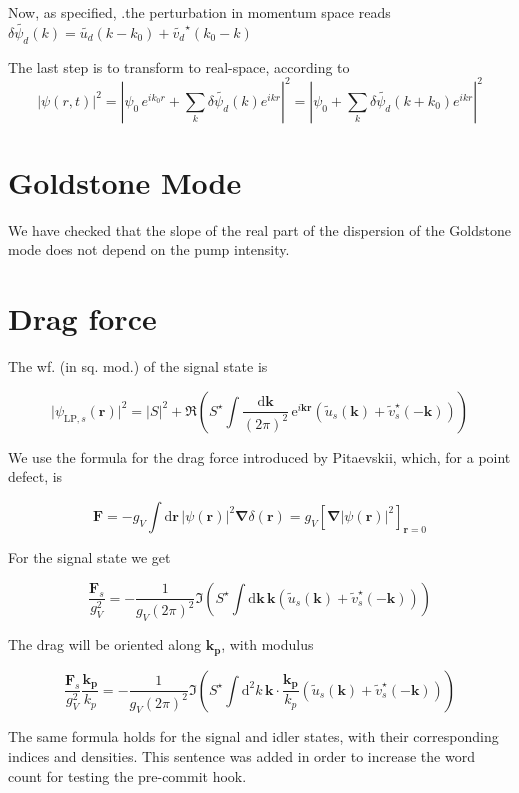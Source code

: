 \documentclass[a4paper,prb,10pt,aps,twocolumn]{revtex4-1}
\newcommand{\vect}[1]{\boldsymbol{#1}}
\begin{document}
Now, as specified, .the perturbation in momentum space reads 
$\delta\widetilde{\psi_{d}}(k)=\widetilde{u_{d}}(k-
k_{0})+\widetilde{v_{d}}^{\star}(k_{0}-k)$

The last step is to transform to real-space, according to
\[
\left|\psi(r,t)\right|^{2}=\left|\psi_{0}\, 
e^{ik_{0}r}+\sum_{k}\delta\widetilde{\psi_{d}}
(k)e^{ikr}\right|^{2}=\left|\psi_{0}+\sum_{k}\delta\widetilde{\psi_{d}}
(k+k_{0})e^{ikr}\right|^{2}
\]


\section{Goldstone Mode}
\label{sec:goldstone}

We have checked that the slope of the real part of the dispersion of the 
Goldstone mode does not depend on the pump intensity.

\section{Drag force}
\label{sec:drag}

The wf. (in sq. mod.) of the signal state is

\begin{equation}
\vert \psi_{\text{LP},s}(\vect{r})\vert^2 = \vert S \vert^2 + \Re\left( S^{\star} 
\int \frac{\mathrm{d}\vect{k}}{(2 \pi)^2}\, \mathrm{e}^{i \vect{k} \vect{r}} 
\left( \widetilde{u}_s(\vect{k}) + \widetilde{v}_s^{\star}(-\vect{k}) \right) 
\right)
\end{equation}

We use the formula for the drag force introduced by Pitaevskii, which, for a 
point defect, is

\begin{equation}
\vect{F}= - g_V \int \mathrm{d} \vect{r} \, \vert \psi(\vect{r}) \vert ^2 
\vect{\nabla} \delta(\vect{r}) = g_V \left[ \vect{\nabla} \vert \psi(\vect{r}) 
\vert ^2 \right]_{\vect{r}=0}
\end{equation}

For the signal state we get

\begin{equation}
\frac{\vect{F}_s}{g_V^2} = -\frac{1}{g_V (2 \pi)^2} \Im \left( S^{\star} \int 
\mathrm{d}\vect{k} \, \vect{k} \left( \widetilde{u}_s(\vect{k}) + 
\widetilde{v}_s^{\star}(-\vect{k}) \right) \right)
\end{equation}

The drag will be oriented along $\vect{k_p}$, with modulus

\begin{equation}
\frac{\vect{F}_s}{g_V^2} \frac{\vect{k_p}}{k_p} = -\frac{1}{g_V (2 \pi)^2} \Im 
\left( S^{\star} \int \mathrm{d}^2 k \, \vect{k} \cdot \frac{\vect{k_p}}{k_p} 
\left( \widetilde{u}_s(\vect{k}) + \widetilde{v}_s^{\star}(-\vect{k}) \right) 
\right)
\end{equation}

The same formula holds for the signal and idler states, with their
corresponding indices and densities. This sentence was added in order
to increase the word count for testing the pre-commit hook.



\end{document}
